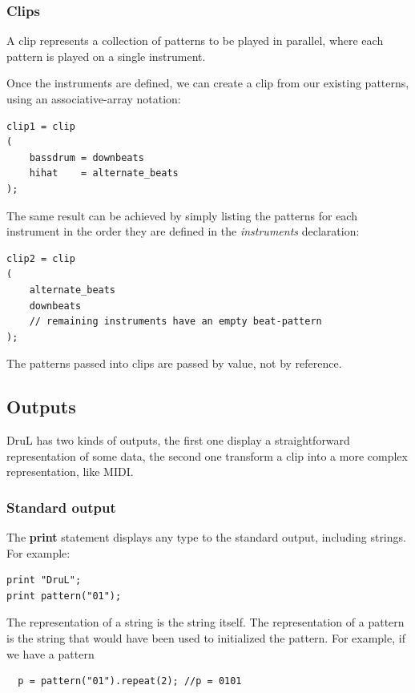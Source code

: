 \documentclass[11pt,twoside]{article}
\begin{document}
\subsubsection{Clips}

A clip represents a collection of patterns to be played in parallel, where each pattern is played on a single instrument.

Once the instruments are defined, we can create a clip from our existing patterns, using an
associative-array notation:

\begin{verbatim}
clip1 = clip
(
    bassdrum = downbeats
    hihat    = alternate_beats
);
\end{verbatim}
The same result can be achieved by simply listing the patterns for each instrument in the order they are defined in the \textit{instruments} declaration:
\begin{verbatim}
clip2 = clip
(
    alternate_beats
    downbeats
    // remaining instruments have an empty beat-pattern
);

\end{verbatim}
The patterns passed into clips are passed by value, not by reference.





\subsection{Outputs}

DruL has two kinds of outputs, the first one display a straightforward
representation of some data, the second one transform a clip into a
more complex representation, like MIDI.

\subsubsection{Standard output}

The \textbf{print} statement displays any type to the standard
output, including strings. For example:
\begin{verbatim}
print "DruL";
print pattern("01");
\end{verbatim}

The representation of a string is the string itself. The representation
of a pattern is the string that would have been used to initialized
the pattern. For example, if we have a pattern
\begin{verbatim}
  p = pattern("01").repeat(2); //p = 0101
\end{verbatim}
\end{document}
